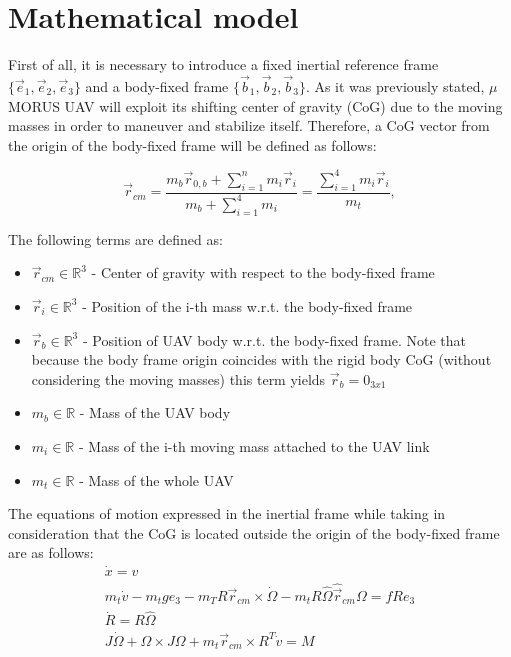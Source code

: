 \section{Mathematical model}

First of all, it is necessary to introduce a fixed inertial reference frame $\{ \vec{e}_1, \vec{e}_2, \vec{e}_3  \}$ and a body-fixed frame $ \{ \vec{b}_1, \vec{b}_2, \vec{b}_3 \}$. As it was previously stated, $\mu$MORUS UAV will exploit its shifting center of gravity (CoG) due to the moving masses in order to maneuver and stabilize itself. Therefore, a CoG vector from the origin of the body-fixed frame will be defined as follows:

\begin{equation}
	\vec{r}_{cm} = \frac{m_{b}\vec{r}_{0,b} + \sum_{i=1}^n m_{i}\vec{r}_{i}}{m_{b} + \sum_{i=1}^4 m_{i}} = \frac{\sum_{i=1}^4 m_{i}\vec{r}_{i}}{m_t},
	\label{equ:cog}
\end{equation}

The following terms are defined as: 
\begin{itemize}
	\item $\vec{r}_{cm} \in \mathbb{R}^3$ - Center of gravity with respect to the body-fixed frame
	
	\item $\vec{r}_{i} \in \mathbb{R}^3$ - Position of the i-th mass w.r.t. the body-fixed frame
	
	\item $\vec{r}_{b} \in \mathbb{R}^3$ - Position of UAV body w.r.t. the body-fixed frame. Note that because the body frame origin coincides with the rigid body CoG (without considering the moving masses) this term yields $\vec{r}_b = 0_{3x1}$
	
	\item $m_b \in \mathbb{R}$ - Mass of the UAV body 
	
	\item $m_i \in \mathbb{R}$ - Mass of the i-th moving mass attached to the UAV link
	
	\item $m_t \in \mathbb{R}$ - Mass of the whole UAV
\end{itemize}

The equations of motion expressed in the inertial frame while taking in consideration that the CoG is located outside the origin of the body-fixed frame\cite{LeeModel} are as follows: 
\begin{gather}
	\dot{x} = v \label{model1}\\
	m_t\dot{v} - m_tge_3 - m_TR \vec{r}_{cm} \times \dot{\Omega} - m_tR\hat{\Omega}\hat{\vec{r}}_{cm}\Omega = fRe_3 \label{model2} \\
	\dot{R} = R\hat{\Omega} \label{model3} \\
	J \dot{\Omega} + \Omega \times J \Omega + m_t \vec{r}_{cm} \times R^T \dot{v} = M \label{model4}
\end{gather}

